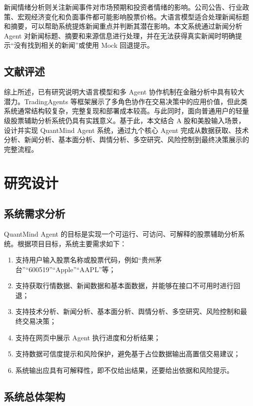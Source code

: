 \documentclass[UTF8,a4paper,12pt]{ctexart}
\begin{document}
新闻情绪分析则关注新闻事件对市场预期和投资者情绪的影响。公司公告、行业政策、宏观经济变化和负面事件都可能影响股票价格。大语言模型适合处理新闻标题和摘要，可以帮助系统提炼新闻重点并判断其潜在影响。本文系统通过新闻分析 Agent 对新闻标题、摘要和来源信息进行处理，并在无法获得真实新闻时明确提示“没有找到相关的新闻”或使用 Mock 回退提示。

\subsection{文献评述}

综上所述，已有研究说明大语言模型和多 Agent 协作机制在金融分析中具有较大潜力。TradingAgents 等框架展示了多角色协作在交易决策中的应用价值，但此类系统通常结构较复杂，完整复现和部署成本较高。与此同时，面向普通用户的轻量级股票辅助分析系统仍具有实践意义。基于此，本文结合 A 股和美股输入场景，设计并实现 QuantMind Agent 系统，通过九个核心 Agent 完成从数据获取、技术分析、新闻分析、基本面分析、舆情分析、多空研究、风险控制到最终决策展示的完整流程。

\section{研究设计}

\subsection{系统需求分析}

QuantMind Agent 的目标是实现一个可运行、可访问、可解释的股票辅助分析系统。根据项目目标，系统主要需求如下：

\begin{enumerate}
    \item 支持用户输入股票名称或股票代码，例如“贵州茅台”“600519”“Apple”“AAPL”等；
    \item 支持获取行情数据、新闻数据和基本面数据，并能够在接口不可用时进行回退；
    \item 支持技术分析、新闻分析、基本面分析、舆情分析、多空研究、风险控制和最终交易决策；
    \item 支持在网页中展示 Agent 执行进度和分析结果；
    \item 支持数据可信度提示和风险保护，避免基于占位数据输出高置信交易建议；
    \item 系统输出应具有可解释性，即不仅给出结果，还要给出依据和风险提示。
\end{enumerate}

\subsection{系统总体架构}
\end{document}
